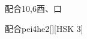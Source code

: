 \begin{entry}{配合}{10,6}{⾣、⼝}
  \begin{phonetics}{配合}{pei4he2}[][HSK 3]
  \end{phonetics}
\end{entry}
